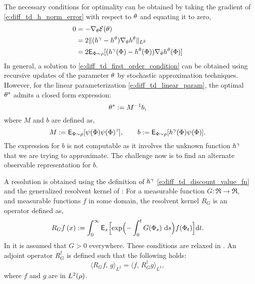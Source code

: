 The necessary conditions for optimality can be obtained by taking the gradient of \eqref{e:diff_td_h_norm_error} with respect to $\theta$ and equating it to zero, 
\begin{equation}
\begin{aligned}
0 &= - \nabla_\param \error(\param)\\
& = 2 \|(h^\discount - h^\param) \nabla_\param h^\param \|_{L^2} \\
& = 2 \Expect_{\markovstate \sim \pr} [(h^\discount(\markovstate) - h^\param(\markovstate)) \nabla_\param h^\param(\markovstate)]
\end{aligned}
\label{e:diff_td_first_order_condition}
\end{equation} 
In general, a solution to \eqref{e:diff_td_first_order_condition} can be obtained using recursive updates of the parameter $\theta$ by stochastic approximation techniques. However, for the linear parameterization \eqref{e:diff_td_linear_param}, the optimal $\theta^*$ admits a closed form expression:
\begin{equation}
\param^* := M^{-1} b,
\label{e:diff_td_param_opt_lstd}
\end{equation}
where $M$ and $b$ are defined as,
\begin{equation}
M: = \Expect_{\markovstate \sim \pr} [\basis(\markovstate) \basis(\markovstate)^\transpose], \qquad b:= \Expect_{\markovstate \sim \pr} [h^\discount(\markovstate) \basis(\markovstate)].
\label{e:diff_td_lstd_M_b}
\end{equation}
The expression for $b$ is not computable as it involves the unknown function $h^\gamma$ that we are trying to approximate. The challenge now is to find an alternate observable representation for $b$. 

A resolution is obtained using the definition of $h^\gamma$ \eqref{e:diff_td_discount_value_fn} and the generalized resolvent kernel of \cite{nev72,meytwe93e,devkonmey17a}: For a measurable function $G\colon\Re\to\Re$, and measurable functions $f$ in some domain, the resolvent kernel $R_G$ is an operator defined as,
\begin{equation}
R_G f\, (x) := \int_0^\infty \Expect_x\Bigl[ \exp\Bigl(-\int_0^t G(\markovstate_s)\, \rmd s \Bigr) f(\markovstate_t)\Bigr] \ud t.
\label{e:diff_td_resolvent_neveu}
\end{equation}
In  \cite{nev72,meytwe93e} it is assumed that $G>0$ everywhere. These conditions are relaxed in \cite{konmey03a,devkonmey17a}. An adjoint operator $R^\dagger_G$ is defined such that the following holds:
\begin{equation}
\langle R_G f,\, g \rangle_{L^2} = \langle f ,\, R^\dagger_G g \rangle_{L^2}, 
\label{e:diff_td_resolvent_adjoint}
\end{equation}
where $f$ and $g$ are in $L^2(\rho)$. 


